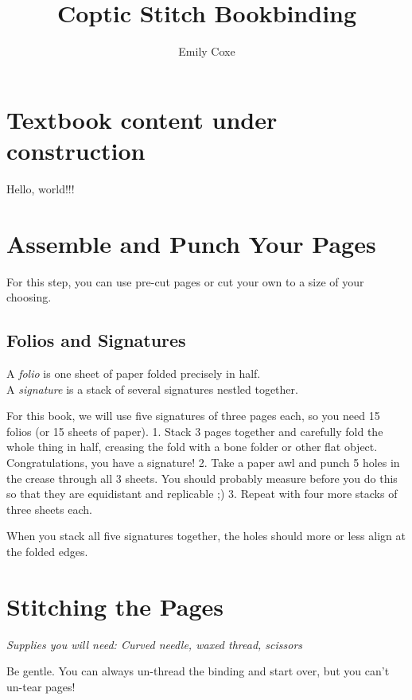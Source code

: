 \documentclass[
  openany]{book}
\title{Coptic Stitch Bookbinding}
\author{Emily Coxe}
\date{}
\begin{document}
\maketitle

{
\setcounter{tocdepth}{1}
\tableofcontents
}
\chapter{Textbook content under construction}\label{textbook-content-under-construction}

Hello, world!!!

\chapter{Assemble and Punch Your Pages}\label{assemble-and-punch-your-pages}

For this step, you can use pre-cut pages or cut your own to a size of your choosing.

\section{Folios and Signatures}\label{folios-and-signatures}

A \emph{folio} is one sheet of paper folded precisely in half.\\
A \emph{signature} is a stack of several signatures nestled together.

For this book, we will use five signatures of three pages each, so you need 15 folios (or 15 sheets of paper).
1. Stack 3 pages together and carefully fold the whole thing in half, creasing the fold with a bone folder or other flat object. Congratulations, you have a signature!
2. Take a paper awl and punch 5 holes in the crease through all 3 sheets. You should probably measure before you do this so that they are equidistant and replicable ;)
3. Repeat with four more stacks of three sheets each.

When you stack all five signatures together, the holes should more or less align at the folded edges.

\chapter{Stitching the Pages}\label{stitching-the-pages}

\emph{Supplies you will need: Curved needle, waxed thread, scissors}

Be gentle. You can always un-thread the binding and start over, but you can't un-tear pages!
\end{document}
